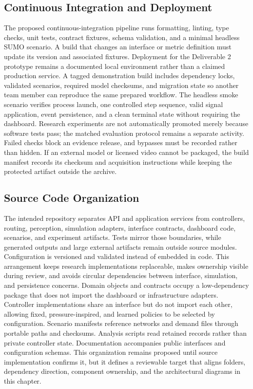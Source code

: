 \subsection{Continuous Integration and Deployment}

The proposed continuous-integration pipeline runs formatting, linting, type checks, unit tests, contract fixtures, schema validation, and a minimal headless SUMO scenario. A build that changes an interface or metric definition must update its version and associated fixtures. Deployment for the Deliverable 2 prototype remains a documented local environment rather than a claimed production service. A tagged demonstration build includes dependency locks, validated scenarios, required model checksums, and migration state so another team member can reproduce the same prepared workflow. The headless smoke scenario verifies process launch, one controlled step sequence, valid signal application, event persistence, and a clean terminal state without requiring the dashboard. Research experiments are not automatically promoted merely because software tests pass; the matched evaluation protocol remains a separate activity. Failed checks block an evidence release, and bypasses must be recorded rather than hidden. If an external model or licensed video cannot be packaged, the build manifest records its checksum and acquisition instructions while keeping the protected artifact outside the archive.

\subsection{Source Code Organization}

The intended repository separates API and application services from controllers, routing, perception, simulation adapters, interface contracts, dashboard code, scenarios, and experiment artifacts. Tests mirror those boundaries, while generated outputs and large external artifacts remain outside source modules. Configuration is versioned and validated instead of embedded in code. This arrangement keeps research implementations replaceable, makes ownership visible during review, and avoids circular dependencies between interface, simulation, and persistence concerns. Domain objects and contracts occupy a low-dependency package that does not import the dashboard or infrastructure adapters. Controller implementations share an interface but do not import each other, allowing fixed, pressure-inspired, and learned policies to be selected by configuration. Scenario manifests reference networks and demand files through portable paths and checksums. Analysis scripts read retained records rather than private controller state. Documentation accompanies public interfaces and configuration schemas. This organization remains proposed until source implementation confirms it, but it defines a reviewable target that aligns folders, dependency direction, component ownership, and the architectural diagrams in this chapter.

